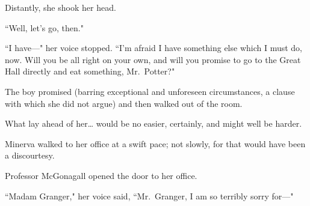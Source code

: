 Distantly, she shook her head.

``Well, let's go, then."

``I have—" her voice stopped. ``I'm afraid I have something else which I must do, now. Will you be all right on your own, and will you promise to go to the Great Hall directly and eat something, Mr.~Potter?"

The boy promised (barring exceptional and unforeseen circumstances, a clause with which she did not argue) and then walked out of the room.

What lay ahead of her{\ldots} would be no easier, certainly, and might well be harder.

\later

Minerva walked to her office at a swift pace; not slowly, for that would have been a discourtesy.

Professor McGonagall opened the door to her office.

``Madam Granger," her voice said, ``Mr.~Granger, I am so terribly sorry for—"

